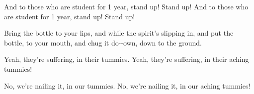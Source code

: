 \begin{verse*}
And to those who are student for 1 year, stand up! Stand up!
And to those who are student for 1 year, stand up! Stand up!
\end{verse*}

\begin{verse*}
Bring the bottle to your lips, and
while the spirit's slipping in, and
put the bottle, to your mouth, and
chug it do--own,
down to the ground.
\end{verse*}

\begin{verse*}
Yeah, they're suffering, 
in their tummies. 
Yeah, they're suffering, 
in their aching tummies!
\end{verse*}

\begin{verse*}
No, we're nailing it, 
in our tummies. 
No, we're nailing it, 
in our aching tummies!
\end{verse*}

\begin{verse*}
\end{verse*}
